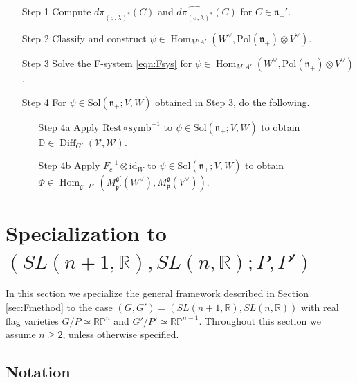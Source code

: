 \documentclass[reqno,11pt]{amsart}
\theoremstyle{remark}
\theoremstyle{definition}
\numberwithin{equation}{section}
\newcommand{\fg}{{\mathfrak g}}
\newcommand{\fn}{{\mathfrak n}}
\newcommand{\fp}{{\mathfrak p}}
\newcommand{\R}{\mathbb{R}}
\newcommand{\Hom}{\operatorname{Hom}}
\newcommand{\Pol}{\mathrm{Pol}}
\newcommand{\id}{\mathrm{id}}
\newcommand{\symb}{\mathrm{symb}}
\newcommand{\RP}{\mathbb{R}\mathbb{P}}
\newcommand{\Mp}{M^{\fg}_{\fp}}
\newcommand{\Mpp}{M^{\fg'}_{\fp'}}
\newcommand{\Rest}{\mathrm{Rest}}
\newcommand{\bD}{\mathbb{D}}
\begin{document}
\begin{enumerate}

\item[Step 1]
Compute $d\pi_{(\sigma,\lambda)^*}(C)$ and 
$\widehat{d\pi_{(\sigma,\lambda)^*}}(C)$
for $C \in \fn_+'$.
\vskip 0.1in

\item[Step 2]
Classify and construct 
$\psi \in \Hom_{M'A'}(W^\vee, \Pol(\fn_+)\otimes V^\vee)$.
\vskip 0.1in

\item[Step 3]
Solve the F-system \eqref{eqn:Fsys}
for $\psi \in \Hom_{M'A'}(W^\vee, \Pol(\fn_+)\otimes V^\vee)$.
\vskip 0.1in

\item[Step 4]
For $\psi \in \mathrm{Sol}(\mathfrak n_+;V,W)$ obtained in Step 3,
do the following.
\vskip 0.1in

\begin{enumerate}
\item[Step 4a]
Apply $\Rest \circ \symb^{-1}$ 
to $\psi \in \mathrm{Sol}(\mathfrak n_+;V,W)$
to obtain $\bD \in  \operatorname{Diff}_{G'}(\mathcal V, \mathcal W)$.
\vskip 0.1in
\item[Step 4b]
Apply $F_c^{-1} \otimes \id_W$ 
to $\psi \in \mathrm{Sol}(\mathfrak n_+;V,W)$
to obtain $\Phi \in \operatorname{Hom}_{\mathfrak{g}',P'}
(\Mpp(W^\vee), \Mp(V^\vee))$.
\end{enumerate}
\vskip 0.1in

\end{enumerate}

\section{Specialization to $(SL(n+1,\R), SL(n,\R);P, P')$}
\label{sec:SL}

In this section we specialize the general framework 
described in Section \ref{sec:Fmethod}
to the case $(G,G')=(SL(n+1,\R),SL(n,\R))$ with real flag varieties
 $G/P\simeq \RP^n$ and $G'/P'\simeq \RP^{n-1}$. 
Throughout this section we assume $n\geq 2$, unless otherwise specified.

\subsection{Notation}\label{sec:notation}
\end{document}
